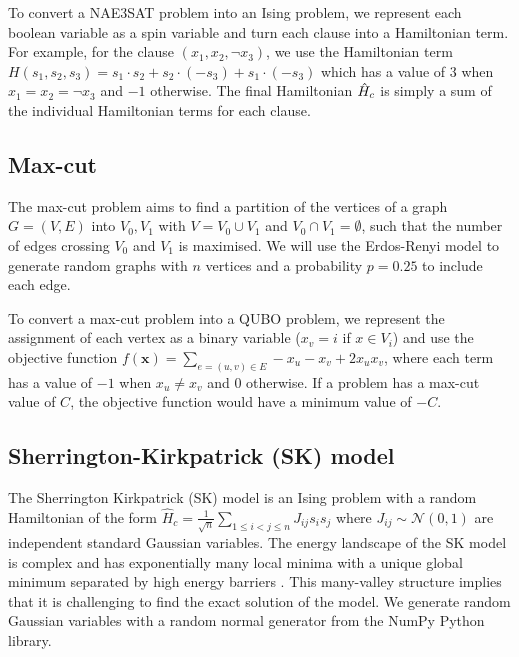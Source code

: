 To convert a NAE3SAT problem into an Ising problem, we represent each boolean variable as a spin variable and turn each clause into a Hamiltonian term. For example, for the clause $(x_1, x_2, \neg x_3)$, we use the Hamiltonian term $H(s_1, s_2, s_3) = s_1 \cdot s_2 + s_2 \cdot (-s_3) + s_1 \cdot (-s_3)$ which has a value of $3$ when $x_1=x_2=\neg x_3$ and $-1$ otherwise. The final Hamiltonian $\Hat{H}_c$ is simply a sum of the individual Hamiltonian terms for each clause.

\subsection*{Max-cut}
The max-cut problem aims to find a partition of the vertices of a graph $G = (V, E)$ into $V_0, V_1$ with $V = V_0 \cup V_1$ and $V_0 \cap V_1 = \emptyset$, such that the number of edges crossing $V_0$ and $V_1$ is maximised. We will use the Erdos-Renyi model to generate random graphs with $n$ vertices and a probability $p=0.25$ to include each edge.

To convert a max-cut problem into a QUBO problem, we represent the assignment of each vertex as a binary variable ($x_v = i$ if $x \in V_i$) and use the objective function $f(\mathbf{x}) = \sum_{e = (u, v) \in E} -x_u - x_v + 2x_u x_v$, where each term has a value of $-1$ when $x_u  \neq x_v$ and $0$ otherwise. If a problem has a max-cut value of $C$, the objective function would have a minimum value of $-C$. 

\subsection*{Sherrington-Kirkpatrick (SK) model}
The Sherrington Kirkpatrick (SK) model is an Ising problem with a random Hamiltonian of the form $\hat{H}_c = \frac{1}{\sqrt{n}} \sum_{1 \leq i < j \leq n} J_{ij}s_i s_j$
where $J_{ij} \sim \mathcal{N}(0,1)$ are independent standard Gaussian variables. The energy landscape of the SK model is complex and has exponentially many local minima with a unique global minimum separated by high energy barriers \cite{skmodel}. This many-valley structure implies that it is challenging to find the exact solution of the model. We generate random Gaussian variables with a random normal generator from the NumPy Python library.


